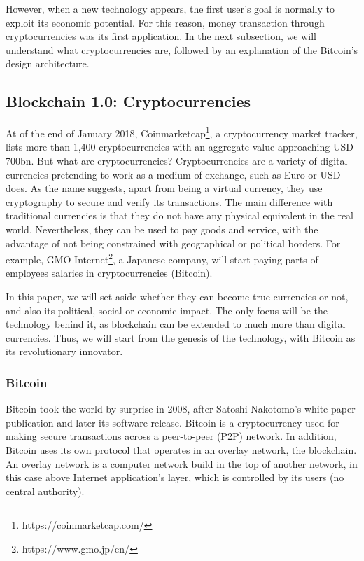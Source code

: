 However, when a new technology appears, the first user's goal is normally to exploit its economic potential. For this reason, money transaction through cryptocurrencies was its first application. In the next subsection, we will understand what cryptocurrencies are, followed by an explanation of the Bitcoin's design architecture.

\subsection{Blockchain 1.0: Cryptocurrencies}

At of the end of January 2018, Coinmarketcap\footnote{https://coinmarketcap.com/}, a cryptocurrency market tracker, lists more than 1,400 cryptocurrencies with an aggregate value approaching USD 700bn.  But what are cryptocurrencies? Cryptocurrencies are a variety of digital currencies pretending to work as a medium of exchange, such as Euro or USD does. As the name suggests, apart from being a virtual currency, they use cryptography to secure and verify its transactions. The main difference with traditional currencies is that they do not have any physical equivalent in the real world. Nevertheless, they can be used to pay goods and service, with the advantage of not being constrained with geographical or political borders. For example, GMO Internet\footnote{https://www.gmo.jp/en/}, a Japanese company, will start paying parts of employees salaries in cryptocurrencies (Bitcoin).

In this paper, we will set aside whether they can become true currencies or not, and also its political, social or economic impact. The only focus will be the technology behind it, as blockchain can be extended to much more than digital currencies. Thus, we will start from the genesis of the technology, with Bitcoin as its revolutionary innovator.


\subsubsection{Bitcoin}

Bitcoin took the world by surprise in 2008, after Satoshi Nakotomo's white paper publication \cite{nakamoto2008bitcoin} and later its software release. Bitcoin is a cryptocurrency used for making secure transactions across a peer-to-peer (P2P) network. In addition, Bitcoin uses its own protocol that operates in an overlay network, the blockchain. An overlay network is a computer network build in the top of another network, in this case above Internet application's layer, which is controlled by its users (no central authority).

